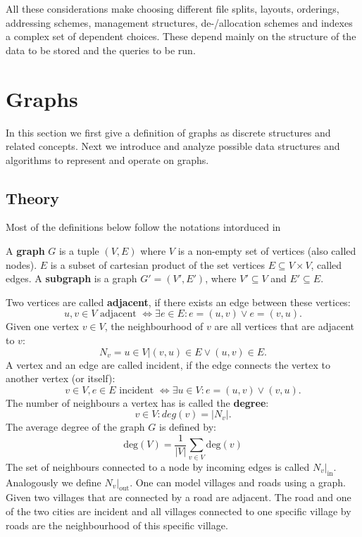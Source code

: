    All these considerations make choosing different file splits, layouts, orderings, addressing schemes, management structures, de-/allocation schemes and indexes a complex set of dependent choices. 
    These depend mainly on the structure of the data to be stored and the queries to be run.
    
\section{Graphs
}\label{\positionnumber}
In this section we first give a definition of graphs as discrete structures and related concepts. Next we introduce and analyze possible data structures and algorithms to represent and operate on graphs. 
        \subsection{Theory}\label{\positionnumber}
            Most of the definitions below follow the notations intorduced in ~\autocite{steger2007diskrete, Gross1998GraphTA, aho1974design, cormen2009introduction, Goodrich2014AlgorithmDA}
        
            A \textbf{graph} $G$ is a tuple $(V, E)$ where $V$ is a non-empty set of vertices (also called nodes). 
            $E$ is a subset of cartesian product of the set vertices $E \subseteq V \times V$, called edges.
            A \textbf{subgraph} is a graph $G' = (V', E')$, where $V' \subseteq V$ and $E' \subseteq E$. 
            
            Two vertices are called \textbf{adjacent}, if there exists an edge between these vertices: 
            \[ u,v \in V \text{ adjacent } \Leftrightarrow \exists e \in E: e = (u, v) \vee e= (v, u).\]
            Given one vertex $v \in V$, the neighbourhood of $v$ are all vertices that are adjacent to $v$: 
            \[N_v = {u \in V | (v, u) \in E \vee (u, v) \in E}.\] 
            A vertex and an edge are called incident, if the edge connects the vertex to another vertex (or itself): 
            \[v \in V, e\in E \text{ incident } \Leftrightarrow \exists u \in V: e = (u,v) \vee (v,u).\]
            The number of neighbours a vertex has is called the \textbf{degree}: 
            \[v \in V: deg(v) = |N_v|.\]
            The average degree of the graph $G$ is defined by:
            \[ \text{deg}(V) = \frac{1}{|V|} \sum_{v \in V}\text{deg}(v)\]
            The set of neighbours connected to a node by incoming edges is called $N_v |_\text{in}$. Analogously we define $N_v |_\text{out}$.             
            One can model villages and roads using a graph. 
            Given two villages that are connected by a road are adjacent. 
            The road and one of the two cities are incident and all villages connected to one specific village by roads are the neighbourhood of this specific village. 
            
